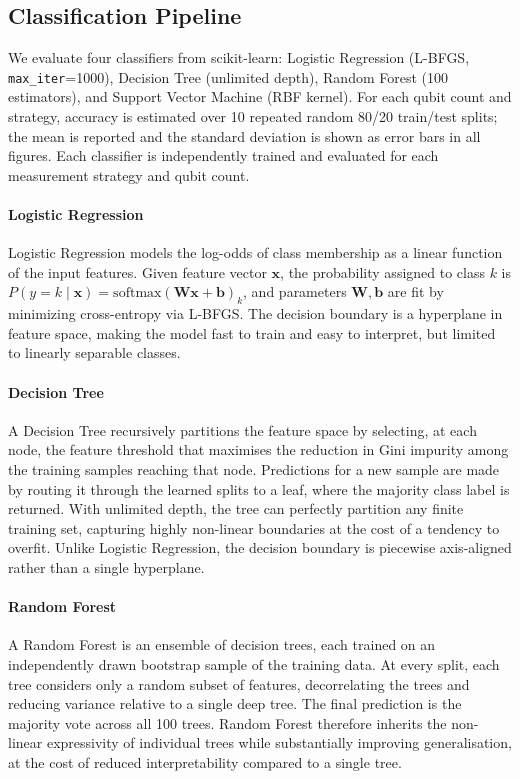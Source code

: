 \documentclass[conference]{IEEEtran}
\begin{document}
\subsection{Classification Pipeline}

We evaluate four classifiers from scikit-learn: Logistic Regression (L-BFGS, \texttt{max\_iter}=1000), Decision Tree (unlimited depth), Random Forest (100 estimators), and Support Vector Machine (RBF kernel).
For each qubit count and strategy, accuracy is estimated over 10 repeated random 80/20 train/test splits; the mean is reported and the standard deviation is shown as error bars in all figures.
Each classifier is independently trained and evaluated for each measurement strategy and qubit count.

\paragraph{Logistic Regression}
Logistic Regression models the log-odds of class membership as a linear function of the input features.
Given feature vector $\mathbf{x}$, the probability assigned to class $k$ is
$P(y=k \mid \mathbf{x}) = \mathrm{softmax}(\mathbf{W}\mathbf{x} + \mathbf{b})_k$,
and parameters $\mathbf{W}, \mathbf{b}$ are fit by minimizing cross-entropy via L-BFGS.
The decision boundary is a hyperplane in feature space, making the model fast to train and easy to interpret, but limited to linearly separable classes.

\paragraph{Decision Tree}
A Decision Tree recursively partitions the feature space by selecting, at each node, the feature threshold that maximises the reduction in Gini impurity among the training samples reaching that node.
Predictions for a new sample are made by routing it through the learned splits to a leaf, where the majority class label is returned.
With unlimited depth, the tree can perfectly partition any finite training set, capturing highly non-linear boundaries at the cost of a tendency to overfit.
Unlike Logistic Regression, the decision boundary is piecewise axis-aligned rather than a single hyperplane.

\paragraph{Random Forest}
A Random Forest is an ensemble of decision trees, each trained on an independently drawn bootstrap sample of the training data.
At every split, each tree considers only a random subset of features, decorrelating the trees and reducing variance relative to a single deep tree.
The final prediction is the majority vote across all 100 trees.
Random Forest therefore inherits the non-linear expressivity of individual trees while substantially improving generalisation, at the cost of reduced interpretability compared to a single tree.
\end{document}
